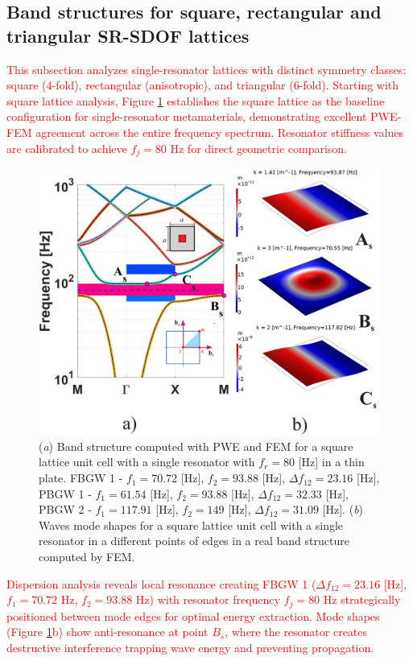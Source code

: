 \documentclass[review,numbers,sort&compress]{elsarticle}
\begin{document}
\subsection{Band structures for square, rectangular and triangular SR-SDOF lattices}
\label{srt_disp_pwe}
\textcolor{red}{This subsection analyzes single-resonator lattices with distinct symmetry classes: square (4-fold), rectangular (anisotropic), and triangular (6-fold). Starting with square lattice analysis, Figure \ref{pwe_fem_disp_modal_square} establishes the square lattice as the baseline configuration for single-resonator metamaterials, demonstrating excellent PWE-FEM agreement across the entire frequency spectrum. Resonator stiffness values are calibrated to achieve $f_j = 80$ Hz for direct geometric comparison.}
\newpage
\begin{figure}[htb]
	\centering
	\includegraphics[width=.8\textwidth]{1_1_disp_frf_square.pdf}
	\caption{(\textit{a}) Band structure computed with PWE and FEM for a square lattice unit cell with a single resonator with $f_r = 80$ [Hz] in a thin plate. FBGW 1 - $f_1 = 70.72$ [Hz], $f_2 = 93.88$ [Hz], $\Delta f_{12} = 23.16 $ [Hz], PBGW 1 - $f_1 = 61.54$ [Hz], $f_2 = 93.88$ [Hz], $\Delta f_{12} = 32.33 $ [Hz], PBGW 2 - $f_1 = 117.91$ [Hz], $f_2 = 149$ [Hz], $\Delta f_{12} = 31.09 $ [Hz]. (\textit{b}) Waves mode shapes for a square lattice unit cell with a single resonator in a different points of edges in a real band structure computed by FEM.}
	\label{pwe_fem_disp_modal_square}
\end{figure}
\textcolor{red}{Dispersion analysis reveals local resonance creating FBGW 1 ($\Delta f_{12} = 23.16$ [Hz], $f_1 = 70.72$ Hz, $f_2 = 93.88$ Hz) with resonator frequency $f_j = 80$ Hz strategically positioned between mode edges for optimal energy extraction. Mode shapes (Figure \ref{pwe_fem_disp_modal_square}b) show anti-resonance at point $B_s$, where the resonator creates destructive interference trapping wave energy and preventing propagation.} 
\end{document}

